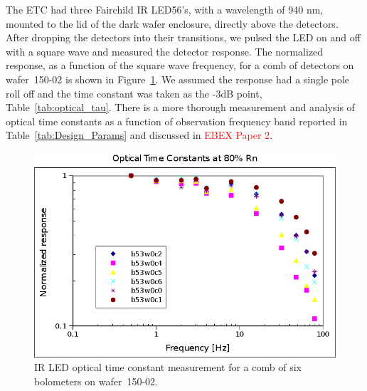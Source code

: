 

%


The \ac{ETC} had three Fairchild IR LED56's, with a wavelength of 940 nm, mounted to the lid of the dark wafer enclosure, directly above the detectors. 
After dropping the detectors into their transitions, we pulsed the LED on and off with a square wave and measured the detector response. 
The normalized response, as a function of the square wave frequency, for a comb of detectors on wafer~150-02 is shown in Figure~\ref{fig:led_tau}.
We assumed the response had a single pole roll off and the time constant was taken as the -3dB point, Table~\ref{tab:optical_tau}. 
There is a more thorough measurement and analysis of optical time constants as a function of observation frequency band reported in Table~\ref{tab:Design_Params} and discussed in \textcolor{red}{EBEX Paper 2}. 

\begin{figure}[htp]
\begin{center}
\includegraphics[width=0.48\columnwidth]{figures/b53w0_ir_led_tau.png}
\caption{IR LED optical time constant measurement for a comb of six bolometers on wafer~150-02. 
\label{fig:led_tau} }
\end{center}
\end{figure}

